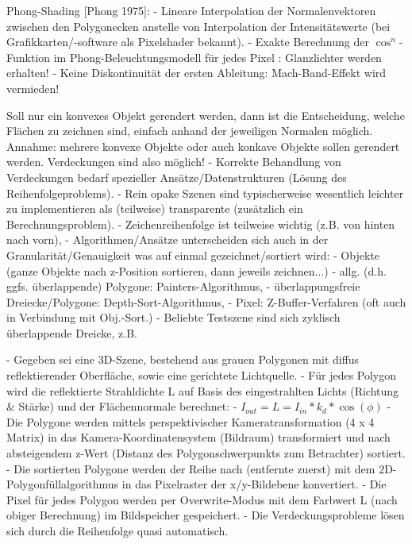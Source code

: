 \documentclass[10pt,landscape]{article}
\makeatletter
\renewcommand{\subsection}{\@startsection{subsection}{2}{0mm}%
                                {-1explus -.5ex minus -.2ex}%
                                {0.5ex plus .2ex}%
                                {\normalfont\normalsize\bfseries}}
\makeatother
\begin{document}
\begin{multicols}{3}
Phong-Shading [Phong 1975]:
- Lineare Interpolation der Normalenvektoren zwischen den Polygonecken anstelle von Interpolation der Intensitätswerte (bei Grafikkarten/-software als Pixelshader bekannt).
- Exakte Berechnung der $\cos^n$-Funktion im Phong-Beleuchtungsmodell für jedes Pixel : Glanzlichter werden erhalten!
- Keine Diskontinuität der ersten Ableitung: Mach-Band-Effekt wird vermieden!


Soll nur ein konvexes Objekt gerendert werden, dann ist die Entscheidung, welche Flächen zu zeichnen sind, einfach anhand der jeweiligen Normalen möglich.\\
Annahme: mehrere konvexe Objekte oder auch konkave Objekte sollen gerendert werden. Verdeckungen sind also möglich!
- Korrekte Behandlung von Verdeckungen bedarf spezieller Ansätze/Datenstrukturen (Lösung des Reihenfolgeproblems).
- Rein opake Szenen sind typischerweise wesentlich leichter zu implementieren als (teilweise) transparente (zusätzlich ein Berechnungsproblem).
- Zeichenreihenfolge ist teilweise wichtig (z.B. von hinten nach vorn), 
- Algorithmen/Ansätze unterscheiden sich auch in der Granularität/Genauigkeit was auf einmal gezeichnet/sortiert wird:
  - Objekte (ganze Objekte nach z-Position sortieren, dann jeweils zeichnen...)
  - allg. (d.h. ggfs. überlappende) Polygone: Painters-Algorithmus,
  - überlappungsfreie Dreiecke/Polygone: Depth-Sort-Algorithmus,
  - Pixel: Z-Buffer-Verfahren (oft auch in Verbindung mit Obj.-Sort.)
- Beliebte Testszene sind sich zyklisch überlappende Dreicke, z.B.

- Gegeben sei eine 3D-Szene, bestehend aus grauen Polygonen mit diffus reflektierender Oberfläche, sowie eine gerichtete Lichtquelle.
- Für jedes Polygon wird die reflektierte Strahldichte L auf Basis des eingestrahlten Lichts (Richtung \& Stärke) und der Flächennormale berechnet:
  - $I_{out} = L = I_{in}* k_d * \cos(\phi)$
- Die Polygone werden mittels perspektivischer Kameratransformation (4 x 4 Matrix) in das Kamera-Koordinatensystem (Bildraum) transformiert und nach absteigendem z-Wert (Distanz des Polygonschwerpunkts zum Betrachter) sortiert.
- Die sortierten Polygone werden der Reihe nach (entfernte zuerst) mit dem 2D-Polygonfüllalgorithmus in das Pixelraster der x/y-Bildebene konvertiert.
- Die Pixel für jedes Polygon werden per Overwrite-Modus mit dem Farbwert L (nach obiger Berechnung) im Bildspeicher gespeichert.
- Die Verdeckungsprobleme lösen sich durch die Reihenfolge quasi automatisch.


\end{multicols}
\end{document}
